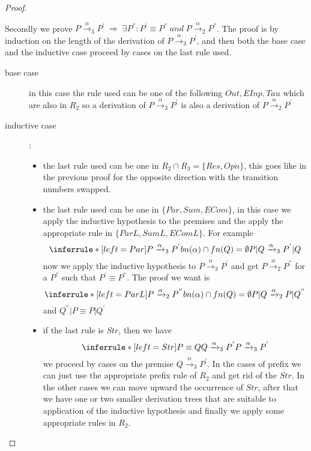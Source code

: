 \begin{theorem}
\begin{proof}
\begin{description}
	Secondly we prove $P\xrightarrow{\alpha}_{3}P^{'}\; \Rightarrow\; \exists P^{''}: P^{'}\equiv P^{''}\; and\; P\xrightarrow{\alpha}_{2}P^{''}$. The proof is by induction on the length of the derivation of $P\xrightarrow{\alpha}_{3}P^{'}$, and then both the base case and the inductive case proceed by cases on the last rule used.
	\begin{description}
	  \item[base case]
	    in this case the rule used can be one of the following $Out, EInp, Tau$ which are also in $R_{2}$ so a derivation of $P\xrightarrow{\alpha}_{3}P^{'}$ is also a derivation of $P\xrightarrow{\alpha}_{2}P^{'}$
	  \item[inductive case]:
	    \begin{itemize}
	      \item 
		the last rule used can be one in $R_{2}\cap R_{3}=\{Res, Opn\}$, this goes like in the previous proof for the opposite direction with the transition numbers swapped.
	      \item
		the last rule used can be one in $\{Par, Sum, ECom\}$, in this case we apply the inductive hypothesis to the premises and the apply the appropriate rule in $\{ParL, SumL, EComL\}$. For example
		\[
		  \inferrule* [left=Par]{
		      P\xrightarrow{\alpha}_{3}P^{'}
		    \\
		      bn(\alpha)\cap fn(Q)=\emptyset
		  }{
		      P|Q\xrightarrow{\alpha}_{3}P^{'}|Q
		  }
		\]	
		now we apply the inductive hypothesis to $P\xrightarrow{\alpha}_{3}P^{'}$ and get $P\xrightarrow{\alpha}_{2}P^{''}$ for a $P^{''}$ such that $P^{'}\equiv P^{''}$. The proof we want is
		\[
		      \inferrule* [left=ParL]{
			  P\xrightarrow{\alpha}_{2}P^{''}
			\\
			  bn(\alpha)\cap fn(Q)=\emptyset
		      }{
			  P|Q\xrightarrow{\alpha}_{2}P|Q^{''}
		      }
		\]
		and $Q^{''}|P\equiv P|Q^{'}$
	      \item
		if the last rule is $Str$, then we have
		\[
		  \inferrule* [left=Str]{
		      P\equiv Q
		    \\
		      Q\xrightarrow{\alpha}_{3}P^{'}
		  }{
		    P\xrightarrow{\alpha}_{3}P^{'}
		  }
		\]
		we proceed by cases on the premise $Q\xrightarrow{\alpha}_{3}P^{'}$. In the cases of prefix we can just use the appropriate prefix rule of $R_{2}$ and get rid of the $Str$. In the other cases we can move upward the occurrence of $Str$, after that we have one or two smaller derivation trees that are suitable to application of the inductive hypothesis and finally we apply some appropriate rules in $R_{2}$.

\end{itemize}
\end{description}
\end{description}
\end{proof}
\end{theorem}
